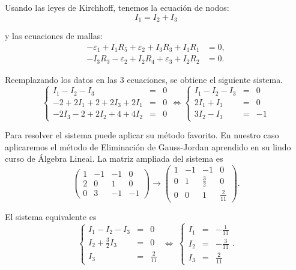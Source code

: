 \begin{ejemplo}
\begin{itemize}
Usando las leyes de Kirchhoff, tenemos la ecuación de nodos:
$$I_1 = I_2 + I_3$$

y las ecuaciones de mallas:
\begin{align*}
  - \varepsilon_1 + I_1 R_5 + \varepsilon_2 + I_3 R_3 + I_1 R_1 &= 0,\\
- I_3 R_3 - \varepsilon_2 + I_2 R_4 + \varepsilon_3 + I_2 R_2 &= 0 . 
\end{align*}

Reemplazando los datos en las 3 ecuaciones, se obtiene el siguiente sistema.
\begin{equation*}
\left\{ \begin{array}{ccl}
I_1 - I_2 - I_3 &=& 0  \\
-2 + 2I_1 + 2 + 2I_3 + 2I_1 &=& 0 \\
-2I_3 - 2 + 2I_2 + 4 +4I_2 &=& 0
\end{array} \right. \Leftrightarrow  \left\{ \begin{array}{ccl}
I_1 - I_2 - I_3 &=& 0  \\
2I_1 + I_3 &=& 0 \\
3I_2 - I_3 &=& -1
\end{array} \right.
\end{equation*}

Para resolver el sistema puede aplicar su método favorito. En nuestro caso aplicaremos el método de Eliminación de Gauss-Jordan aprendido en su lindo curso de Álgebra Lineal. La matriz ampliada del sistema es
\begin{equation*}
\left( \begin{array}{ccc|c}
1 & -1 & -1 & 0 \\
2 & 0 & 1 & 0 \\
0 & 3 & -1 & -1
\end{array} \right)  \longrightarrow \left( \begin{array}{ccc|c}
1 & -1 & -1 & 0 \\
0 & 1 & \frac{3}{2} & 0 \\
0 & 0 & 1 & \frac{2}{11}
\end{array} \right).
\end{equation*}

El sistema equivalente es
\begin{equation*}
\left\{ \begin{array}{ccl}
I_1 - I_2 - I_3 &=& 0  \\
I_2 + \frac{3}{2} I_3 &=& 0 \\
 I_3 &=&  \frac{2}{11}
\end{array} \right. ~\Leftrightarrow~ \left\{ \begin{array}{ccl}
I_1  &=& -\frac{1}{11} \\
I_2  &=& -\frac{3}{11} \\
 I_3 &=&  \frac{2}{11}
\end{array} \right. .
\end{equation*}


\end{itemize}
\end{ejemplo}
